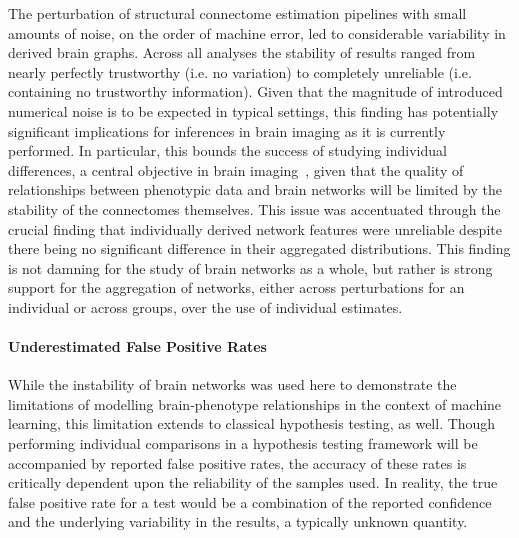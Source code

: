 \documentclass[fleqn,10pt]{SelfArx} %
\begin{document}
The perturbation of structural connectome estimation pipelines with small amounts of noise, on the order of machine
error, led to considerable variability in derived brain graphs. Across all analyses the stability of results ranged
from nearly perfectly trustworthy (i.e. no variation) to completely unreliable (i.e. containing no trustworthy
information). Given that the magnitude of introduced numerical noise is to be expected in typical settings, this
finding has potentially significant implications for inferences in brain imaging as it is currently performed. In
particular, this bounds the success of studying individual differences, a central objective in brain
imaging~\cite{Dubois2016-yr}, given that the quality of relationships between phenotypic data and brain networks will
be limited by the stability of the connectomes themselves. This issue was accentuated through the crucial finding that
individually derived network features were unreliable despite there being no significant difference in their aggregated
distributions. This finding is not damning for the study of brain networks as a whole, but rather is strong support for
the aggregation of networks, either across perturbations for an individual or across groups, over the use of individual
estimates.

\paragraph{Underestimated False Positive Rates}
While the instability of brain networks was used here to demonstrate the limitations of modelling brain-phenotype
relationships in the context of machine learning, this limitation extends to classical hypothesis testing, as well.
Though performing individual comparisons in a hypothesis testing framework will be accompanied by reported false
positive rates, the accuracy of these rates is critically dependent upon the reliability of the samples used. In
reality, the true false positive rate for a test would be a combination of the reported confidence and the underlying
variability in the results, a typically unknown quantity.
\end{document}
